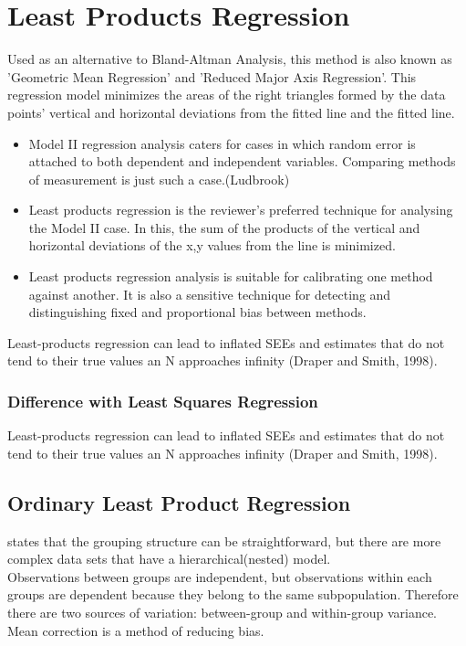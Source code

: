 \documentclass[12pt, a4paper]{report}
\theoremstyle{plain}
\theoremstyle{definition}
\theoremstyle{remark}
\begin{document}
\section{Least Products Regression}
Used as an alternative to Bland-Altman Analysis, this method is also known as 'Geometric Mean Regression' and 'Reduced Major Axis Regression'. This regression model minimizes the areas of the right triangles formed by the data points' vertical and horizontal deviations from the fitted line and the fitted line.

\begin{itemize}
	\item Model II regression analysis caters for cases in which random error is attached to both dependent and independent variables. Comparing methods of measurement is just such a case.(Ludbrook)
	
	\item Least products regression is the reviewer's preferred technique for analysing the Model II case. In this, the sum of the products of the vertical and horizontal deviations of the x,y values from the line is minimized.
	
	\item Least products regression analysis is suitable for calibrating one method against another. It is also a sensitive technique for detecting and distinguishing fixed and proportional bias between
	methods.
\end{itemize}

Least-products regression can lead to inflated SEEs and estimates that do not tend to their true values an N approaches infinity (Draper and Smith, 1998).

\subsubsection{Difference with Least Squares Regression}
Least-products regression can lead to inflated SEEs and estimates
that do not tend to their true values an N approaches infinity
(Draper and Smith, 1998).




\subsection{Ordinary Least Product Regression}
\citet{ludbrook97} states that the grouping structure can be
straightforward, but there are more complex data sets that have a
hierarchical(nested) model.
\\

Observations between groups are independent, but observations
within each groups are dependent because they belong to the same
subpopulation. Therefore there are two sources of variation:
between-group and within-group variance.
\vspace{5 mm} \noindent Mean correction is a method of reducing
bias.
\end{document}
